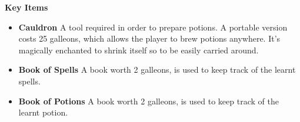 
\textbf{Key Items}\\

\begin{itemize}
    \item \textbf {Cauldron} 
A tool required in order to prepare potions. A portable version costs 25 galleons, which allows the player to brew potions anywhere. It's magically enchanted to shrink itself so to be easily carried around.
 
   \item \textbf{Book of Spells }   
A book worth 2 galleons, is used to keep track of the learnt spells.
   
 \item \textbf{Book of Potions}
 A book worth 2 galleons, is used to keep track of the learnt potion.
\end{itemize}
\pagebreak

